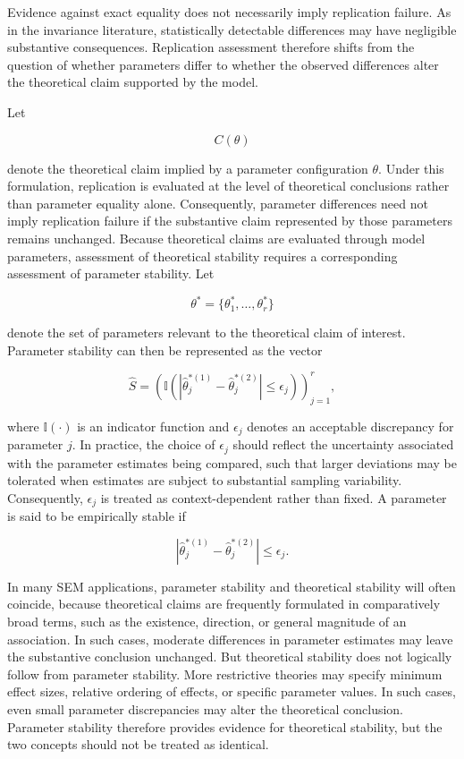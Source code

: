 \documentclass[
  12pt,
  letterpaper,
  man]{apa7}
\begin{document}
Evidence against exact equality does not necessarily imply replication
failure. As in the invariance literature, statistically detectable
differences may have negligible substantive consequences. Replication
assessment therefore shifts from the question of whether parameters
differ to whether the observed differences alter the theoretical claim
supported by the model.

Let

\[
C(\theta)
\]

denote the theoretical claim implied by a parameter configuration
\(\theta\). Under this formulation, replication is evaluated at the
level of theoretical conclusions rather than parameter equality alone.
Consequently, parameter differences need not imply replication failure
if the substantive claim represented by those parameters remains
unchanged. Because theoretical claims are evaluated through model
parameters, assessment of theoretical stability requires a corresponding
assessment of parameter stability. Let

\[ \theta^* = \{\theta_1^*, \dots, \theta_r^*\} \]

denote the set of parameters relevant to the theoretical claim of
interest. Parameter stability can then be represented as the vector

\[ \hat{S} = \left( \mathbb{I}\left(\left|\hat\theta_j^{*(1)} - \hat\theta_j^{*(2)}\right| \le \epsilon_j\right) \right)_{j=1}^r, \]

where \(\mathbb{I}(\cdot)\) is an indicator function and \(\epsilon_j\)
denotes an acceptable discrepancy for parameter \(j\). In practice, the
choice of \(\epsilon_j\) should reflect the uncertainty associated with
the parameter estimates being compared, such that larger deviations may
be tolerated when estimates are subject to substantial sampling
variability. Consequently, \(\epsilon_j\) is treated as
context-dependent rather than fixed. A parameter is said to be
empirically stable if

\[\left|\hat\theta_j^{*(1)} - \hat\theta_j^{*(2)}\right| \le \epsilon_j.\]

In many SEM applications, parameter stability and theoretical stability
will often coincide, because theoretical claims are frequently
formulated in comparatively broad terms, such as the existence,
direction, or general magnitude of an association. In such cases,
moderate differences in parameter estimates may leave the substantive
conclusion unchanged. But theoretical stability does not logically
follow from parameter stability. More restrictive theories may specify
minimum effect sizes, relative ordering of effects, or specific
parameter values. In such cases, even small parameter discrepancies may
alter the theoretical conclusion. Parameter stability therefore provides
evidence for theoretical stability, but the two concepts should not be
treated as identical.
\end{document}
